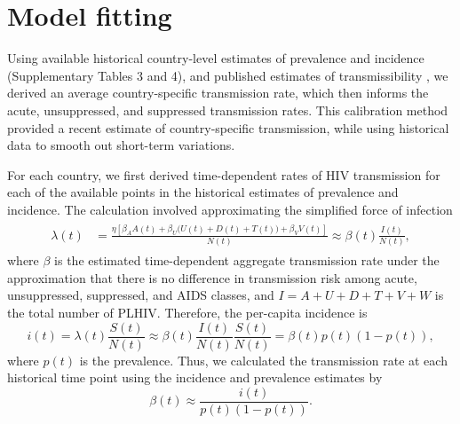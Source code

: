 \documentclass{article}
\begin{document}
\section{Model fitting}
\label{model_fitting}

Using available historical country-level estimates of prevalence and
incidence (Supplementary Tables 3 and 4), and published estimates of
transmissibility
\autocite{Wawer2005-us,Donnell2010-xo,Hughes2012-so,Skarbinski2015-ni},
we derived an average country-specific transmission rate, which then
informs the acute, unsuppressed, and suppressed transmission rates.
This calibration method provided a recent estimate of country-specific
transmission, while using historical data to smooth out short-term
variations.

For each country, we first derived time-dependent rates of HIV
transmission for each of the available points in the historical
estimates of prevalence and incidence.  The calculation involved
approximating the simplified force of infection
\begin{align}
  \label{foi}
  \begin{split}
    \lambda(t) &= \frac{\eta \left[\beta_{A} A(t)
        + \beta_{U} \big(U(t) + D(t) + T(t)\big) +
        \beta_{V} V(t)\right]}{N(t)}
    \approx  \beta(t) \frac{I(t)}{N(t)},
  \end{split}
\end{align}
where $\beta$ is the estimated time-dependent aggregate transmission
rate under the approximation that there is no difference in
transmission risk among acute, unsuppressed, suppressed, and AIDS
classes, and $I = A + U + D + T + V + W$ is the total number of PLHIV.
Therefore, the per-capita incidence is
\begin{equation}
i(t) = \lambda(t) \frac{S(t)}{N(t)}
\approx \beta(t) \frac{I(t)}{N(t)} \frac{S(t)}{N(t)} =\beta(t) p(t) (1-p(t)),
\end{equation}
where $p(t)$ is the prevalence. Thus, we calculated the transmission
rate at each historical time point using the incidence and prevalence
estimates by
\begin{equation}
  \label{trans_rate}
  \beta(t) \approx \frac{i(t)}{p(t)(1-p(t))}.
\end{equation}
\end{document}
